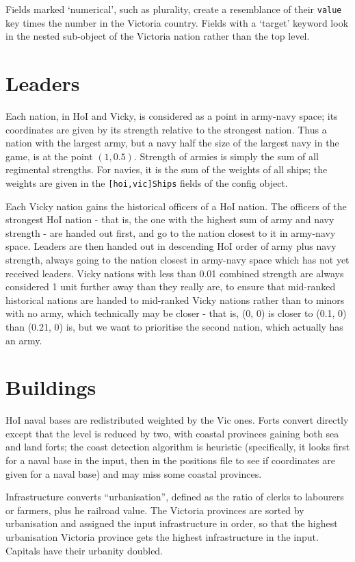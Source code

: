 \documentclass[12pt,ebook,oneside]{book}
\begin{document}
Fields marked `numerical', such as plurality, create a resemblance of
their \texttt{value} key times the number in the Victoria
country. Fields with a `target' keyword look in the nested sub-object of
the Victoria nation rather than the top level. 

\section{Leaders}

Each nation, in HoI and Vicky, is considered as a point in army-navy
space; its coordinates are given by its strength relative to the
strongest nation. Thus a nation with the largest army, but a navy half
the size of the largest navy in the game, is at the point $(1, 0.5)$. 
Strength of armies is simply the sum of all regimental strengths. For
navies, it is the sum of the weights of all ships; the weights are
given in the \texttt{[hoi,vic]Ships} fields of the config object. 

Each Vicky nation gains the historical officers of a HoI nation. The
officers of the strongest HoI nation - that is, the one with the
highest sum of army and navy strength - are handed out first, and go
to the nation closest to it in army-navy space. Leaders are then
handed out in descending HoI order of army plus navy strength, always
going to the nation closest in army-navy space which has not yet
received leaders. Vicky nations with less than 0.01 combined strength
are always considered 1 unit further away than they really are, to
ensure that mid-ranked historical nations are handed to mid-ranked
Vicky nations rather than to minors with no army, which technically
may be closer - that is, (0, 0) is closer to (0.1, 0) than (0.21, 0)
is, but we want to prioritise the second nation, which actually has an
army. 

\section{Buildings}

HoI naval bases are redistributed weighted by the Vic ones. Forts
convert directly except that the level is reduced by two, with coastal provinces gaining both sea and land
forts; the coast detection algorithm is heuristic
(specifically, it looks first for a naval base in the input, then in
the positions file to see if coordinates are given for a naval base)
and may miss some coastal provinces. 

Infrastructure converts ``urbanisation'', defined
as the ratio of clerks to labourers or farmers, plus he railroad value. The Victoria provinces
are sorted by urbanisation and assigned the input
infrastructure in order, so that the highest urbanisation
Victoria province gets the highest infrastructure in the
input. Capitals have their urbanity doubled. 
\end{document}
